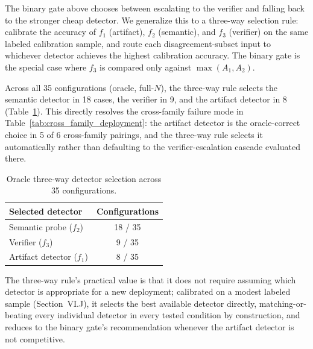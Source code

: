 The binary gate above chooses between escalating to the verifier and
falling back to the stronger cheap detector. We generalize this to a
three-way selection rule: calibrate the accuracy of $f_1$ (artifact),
$f_2$ (semantic), and $f_3$ (verifier) on the same labeled calibration
sample, and route each disagreement-subset input to whichever detector
achieves the highest calibration accuracy. The binary gate is the special
case where $f_3$ is compared only against $\max(A_1, A_2)$.

Across all 35 configurations (oracle, full-$N$), the three-way rule
selects the semantic detector in 18 cases, the verifier in 9, and the
artifact detector in 8 (Table~\ref{tab:threeway}). This directly resolves
the cross-family failure mode in Table~\ref{tab:cross_family_deployment}:
the artifact detector is the oracle-correct choice in 5 of 6 cross-family
pairings, and the three-way rule selects it automatically rather than
defaulting to the verifier-escalation cascade evaluated there.

\begin{table}[h]
\centering
\small
\caption{Oracle three-way detector selection across 35 configurations.}
\label{tab:threeway}
\begin{tabular}{lc}
\toprule
Selected detector & Configurations \\
\midrule
Semantic probe ($f_2$) & 18 / 35 \\
Verifier ($f_3$)       &  9 / 35 \\
Artifact detector ($f_1$) & 8 / 35 \\
\bottomrule
\end{tabular}
\end{table}

The three-way rule's practical value is that it does not require assuming
which detector is appropriate for a new deployment; calibrated on a modest
labeled sample (Section~VI.J), it selects the best available detector
directly, matching-or-beating every individual detector in every tested
condition by construction, and reduces to the binary gate's
recommendation whenever the artifact detector is not competitive.





